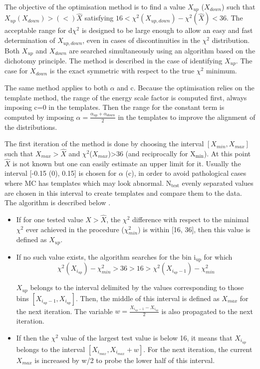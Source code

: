 The objective of the optimisation method is to find a value $X_{up}$ ($X_{down}$) such that $X_{up} (X_{down}) > (<) \hat{X}$ satisfying $16<\chi^2(X_{up,down})-\chi^2(\hat{X})<36$.
The acceptable range for d$\chi^2$ is designed to be large enough to allow an easy and fast determination of $X_{up,down}$, even in cases of discontinuities in the $\chi^2$ distribution.
Both $X_{up}$ and $X_{down}$ are searched simultaneously using an algorithm based on the dichotomy principle.
The method is described in the case of identifying $X_{up}$.
The case for $X_{down}$ is the exact symmetric with respect to the true $\chi^2$ minimum.

The same method applies to both $\alpha$ and c.
Because the optimisation relies on the template method, the range of the energy scale factor is computed first, always imposing c=0 in the templates.
Then the range for the constant term is computed by imposing \(\alpha=\frac{\alpha_{up}+\alpha_{down}}{2}\) in the templates to improve the alignment of the distributions.

The first iteration of the method is done by choosing the interval $[X_{min}, X_{max}]$ such that \(X_{max}>\hat{X}\) and $\chi^2$($X_{max}$)>36 (and reciprocally for X\(_{\text{min}}\)).
At this point \(\hat{X}\) is not known but one can easily estimate an upper limit for it.
Usually the interval [-0.15 (0), 0.15] is chosen for $\alpha$ (c), in order to avoid pathological cases where MC has templates which may look abnormal.
N\(_{\text{test}}\) evenly separated values are chosen in this interval to create templates and compare them to the data.
The algorithm is described below .

\begin{itemize}
\item If for one tested value $X>\hat{X}$, the $\chi^2$ difference with respect to the minimal $\chi^2$ ever achieved in the procedure ($\chi^2_{min}$) is within [16, 36], then this value is defined as $X_{up}$.

\item If no such value exists, the algorithm searches for the bin i\(_{\text{up}}\) for which
\begin{equation}
\chi^{2}(X_{i_{up}})-\chi^2_{min}>36>16>\chi^2(X_{i_{up}-1})-\chi^2_{min}
\end{equation}

$X_{up}$ belongs to the interval delimited by the values corresponding to those bins \([X_{i_{up}-1}, X_{i_{up}}]\).
Then, the middle of this interval is defined as $X_{max}$ for the next iteration.
The variable $w=\frac{X_{i_{up}-1}-X_{i_{up}}}{2}$ is also propagated to the next iteration.

\item If then the $\chi^2$ value of the largest test value is below 16, it means that $X_{i_{up}}$ belongs to the interval $[X_{i_{max}}, X_{i_{max}}+w]$.
For the next iteration, the current $X_{max}$ is increased by w/2 to probe the lower half of this interval.
\end{itemize}


